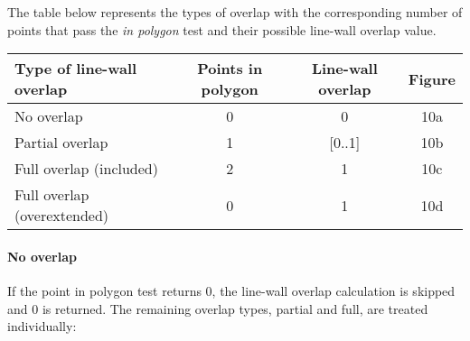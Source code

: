 	The table below represents the types of overlap with the corresponding number of points
	that pass the \emph{in polygon} test and their possible line-wall overlap
	value.\\ 

	\begin{tabular}{|l||c|c|c|}
	\hline
	Type of line-wall overlap 			&	Points in polygon 			& Line-wall overlap & Figure \\
	\hline
	\hline
	No overlap					&	0					& 0		& 10a\\
	\hline
	Partial overlap 				&	1					& [0..1]	& 10b\\
	\hline
	Full overlap (included)		&	2					& 1		& 10c\\
	\hline
	Full overlap (overextended)		&  	0					& 1 		& 10d\\
	\hline
	\end{tabular}

	\paragraph{No overlap}
	If the point in polygon test returns 0, the line-wall overlap calculation
	is skipped and 0 is returned. The remaining overlap types, partial and full,
	are treated individually:\\




